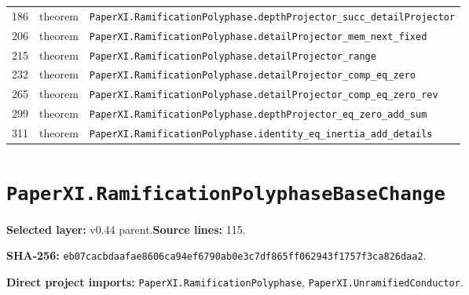 \documentclass[10pt,oneside]{book}
\begin{document}
\begin{longtable}{@{}p{}p{}p{}@{}}
186&theorem&\nolinkurl{PaperXI.RamificationPolyphase.depthProjector_succ_detailProjector}\\

206&theorem&\nolinkurl{PaperXI.RamificationPolyphase.detailProjector_mem_next_fixed}\\

215&theorem&\nolinkurl{PaperXI.RamificationPolyphase.detailProjector_range}\\

232&theorem&\nolinkurl{PaperXI.RamificationPolyphase.detailProjector_comp_eq_zero}\\

265&theorem&\nolinkurl{PaperXI.RamificationPolyphase.detailProjector_comp_eq_zero_rev}\\

299&theorem&\nolinkurl{PaperXI.RamificationPolyphase.depthProjector_eq_zero_add_sum}\\

311&theorem&\nolinkurl{PaperXI.RamificationPolyphase.identity_eq_inertia_add_details}\\

\bottomrule\end{longtable}

\section{\texorpdfstring{\nolinkurl{PaperXI.RamificationPolyphaseBaseChange}}{PaperXI.RamificationPolyphaseBaseChange}}\label{module:PaperXI.RamificationPolyphaseBaseChange}

\textbf{Selected layer:} v0.44 parent.\quad\textbf{Source lines:} 115.\par\textbf{SHA-256:} {\scriptsize\nolinkurl{eb07cacbdaafae8606ca94ef6790ab0e3c7df865ff062943f1757f3ca826daa2}}.


\textbf{Direct project imports:} \nolinkurl{PaperXI.RamificationPolyphase}, \nolinkurl{PaperXI.UnramifiedConductor}.
\end{document}

